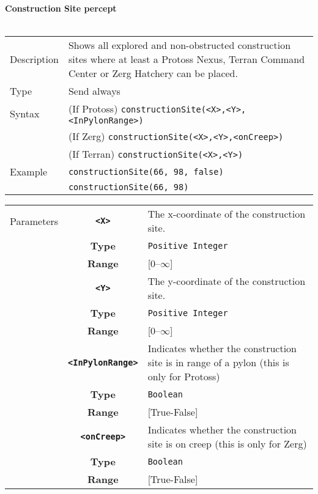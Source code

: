 \noindent
\textbf{Construction Site percept}\\
\\
\begin{tabularx}{\textwidth}{lX}
 Description & Shows all explored and non-obstructed construction sites where at least a Protoss Nexus, Terran Command Center or Zerg Hatchery can be placed. \\
 Type & Send always \\
 Syntax & (If Protoss) \verb|constructionSite(<X>,<Y>,<InPylonRange>)| \\
        & (If Zerg) \verb|constructionSite(<X>,<Y>,<onCreep>)|\\
        & (If Terran) \verb|constructionSite(<X>,<Y>)| \\
 Example & \verb|constructionSite(66, 98, false)| \\
         & \verb|constructionSite(66, 98)| \\
 \end{tabularx}
 \begin{tabularx}{\textwidth}{l | c | p{8cm}|}
 \cline{2-3}
 Parameters & \textbf{\verb|<X>|} & The x-coordinate of the construction site.\\
            & \textbf{Type} & \verb|Positive Integer| \\
            & \textbf{Range} & [0--$\infty$] \\
            \cline{2-3}
            & \textbf{\verb|<Y>|} & The y-coordinate of the construction site.\\
            & \textbf{Type} & \verb|Positive Integer| \\
            & \textbf{Range} & [0--$\infty$] \\
            \cline{2-3}
            & \textbf{\verb|<InPylonRange>|} & Indicates whether the construction site is in range of a pylon (this is only for Protoss)\\
            & \textbf{Type} & \verb|Boolean| \\
            & \textbf{Range} & [True-False] \\
            \cline{2-3}
            & \textbf{\verb|<onCreep>|} & Indicates whether the construction site is on creep (this is only for Zerg)\\
            & \textbf{Type} & \verb|Boolean| \\
            & \textbf{Range} & [True-False] \\
            \cline{2-3}
\end{tabularx} \\
